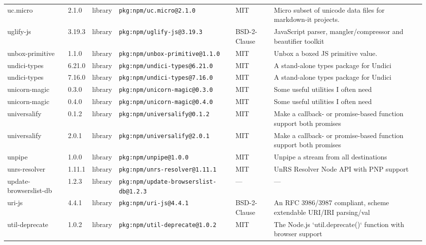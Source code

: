 \documentclass[11pt,a4paper]{article}
\begin{document}
\begin{longtable}{|p{4cm}|p{2cm}|p{1.6cm}|p{5cm}|p{1.5cm}|p{3.5cm}|}
\raggedright uc.micro & 2.1.0 & library & \small\texttt{pkg:npm/uc.micro@2.1.0} & MIT & \small Micro subset of unicode data files for markdown-it projects. \\
\raggedright uglify-js & 3.19.3 & library & \small\texttt{pkg:npm/uglify-js@3.19.3} & BSD-2-Clause & \small JavaScript parser, mangler/compressor and beautifier toolkit \\
\raggedright unbox-primitive & 1.1.0 & library & \small\texttt{pkg:npm/unbox-primitive@1.1.0} & MIT & \small Unbox a boxed JS primitive value. \\
\raggedright undici-types & 6.21.0 & library & \small\texttt{pkg:npm/undici-types@6.21.0} & MIT & \small A stand-alone types package for Undici \\
\raggedright undici-types & 7.16.0 & library & \small\texttt{pkg:npm/undici-types@7.16.0} & MIT & \small A stand-alone types package for Undici \\
\raggedright unicorn-magic & 0.3.0 & library & \small\texttt{pkg:npm/unicorn-magic@0.3.0} & MIT & \small Some useful utilities I often need \\
\raggedright unicorn-magic & 0.4.0 & library & \small\texttt{pkg:npm/unicorn-magic@0.4.0} & MIT & \small Some useful utilities I often need \\
\raggedright universalify & 0.1.2 & library & \small\texttt{pkg:npm/universalify@0.1.2} & MIT & \small Make a callback- or promise-based function support both promises  \\
\raggedright universalify & 2.0.1 & library & \small\texttt{pkg:npm/universalify@2.0.1} & MIT & \small Make a callback- or promise-based function support both promises  \\
\raggedright unpipe & 1.0.0 & library & \small\texttt{pkg:npm/unpipe@1.0.0} & MIT & \small Unpipe a stream from all destinations \\
\raggedright unrs-resolver & 1.11.1 & library & \small\texttt{pkg:npm/unrs-resolver@1.11.1} & MIT & \small UnRS Resolver Node API with PNP support \\
\raggedright update-browserslist-db & 1.2.3 & library & \small\texttt{pkg:npm/update-browserslist-db@1.2.3} & — & \small — \\
\raggedright uri-js & 4.4.1 & library & \small\texttt{pkg:npm/uri-js@4.4.1} & BSD-2-Clause & \small An RFC 3986/3987 compliant, scheme extendable URI/IRI parsing/val \\
\raggedright util-deprecate & 1.0.2 & library & \small\texttt{pkg:npm/util-deprecate@1.0.2} & MIT & \small The Node.js `util.deprecate()` function with browser support \\

\end{longtable}
\end{document}
